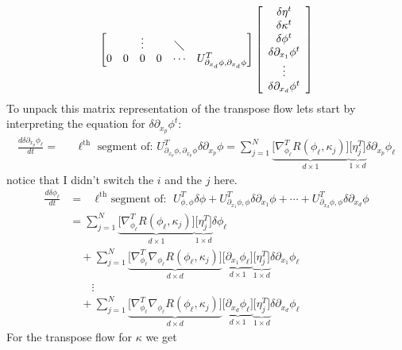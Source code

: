 \documentclass[noinfoline]{imsart}
\begin{document}
{\begin{equation}
\begin{bmatrix}
&&\vdots & &\diagdown& \\
0 & 0 &0 & 0 & \cdots  & U_{\partial_{x_d} \phi,\partial_{x_d} \phi} ^T
\end{bmatrix}
  \left[\begin{array}{c} \delta\eta^t\\ \delta \kappa^t \\ \delta\phi^t \\ \delta\partial_{x_1} \phi^t \\ \vdots \\ \delta\partial_{x_d} \phi^t \end{array}\right]
\end{equation}
To unpack this matrix representation of the transpose flow lets start by interpreting the equation for $\delta\partial_{x_p} \phi^t$:
\begin{align}
\frac{d\delta\partial_{x_p}\phi_\ell}{dt}
=&   \text{ $\ell^{\text{th}}$ segment of: $U_{\partial_{x_p} \phi,\partial_{x_p} \phi} ^T\delta\partial_{x_p}\phi$}
= \sum_{j=1}^N \underbrace{\bigl[ \nabla^T_{\phi_\ell}R(\phi_\ell,\kappa_j)\bigr]}_{d\times 1} \underbrace{\bigl[\eta_j^T\bigr]}_{1\times d}  \delta\partial_{x_p} {\phi}_\ell
\end{align}
notice that I didn't switch the $i$ and the $j$ here.
\begin{align}
\frac{d\delta\phi_\ell}{dt} &= \text{ $\ell^{\text{th}}$ segment of: } U_{\phi,\phi}^T\delta\phi  + U_{\partial_{x_1} \phi,\phi}^T\delta\partial_{x_1} \phi + \cdots  +  U_{\partial_{x_d} \phi,\phi}^T\delta\partial_{x_d} \phi \\
&=  \sum_{j=1}^N  \underbrace{\bigl[ \nabla^T_{\phi_\ell}R(\phi_\ell,\kappa_j)\bigr]}_{d\times 1}\underbrace{\bigl[\eta_j^T\bigr]}_{1\times d} \delta\phi_\ell \\
&\quad+\sum_{j=1}^N \underbrace{\bigl[\nabla_{\phi_\ell}^T\nabla_{\phi_\ell}R(\phi_\ell,\kappa_j)\bigr]}_{d\times d} \underbrace{\bigl[\partial_{x_1} {\phi_\ell}\bigr]}_{d\times 1} \underbrace{\bigl[ \eta_j^T\bigr]}_{1\times d} \delta\partial_{x_1} \phi_\ell \\
 &\qquad\vdots \nonumber\\
 &\quad+ \sum_{j=1}^N \underbrace{\bigl[\nabla_{\phi_\ell}^T\nabla_{\phi_\ell}R(\phi_\ell,\kappa_j)\bigr]}_{d\times d} \underbrace{\bigl[\partial_{x_d} {\phi_\ell}\bigr]}_{d\times 1} \underbrace{\bigl[ \eta_j^T\bigr]}_{1\times d} \delta \partial_{x_d}  \phi_\ell
\end{align}
For the transpose flow for $\kappa$ we get
\begin{align}

\end{align}}
\end{document}

